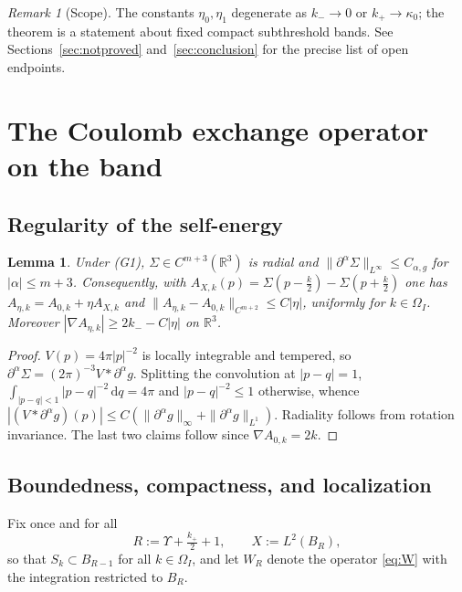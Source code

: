 \documentclass[11pt,a4paper]{amsart}
\newtheorem{lemma}[theorem]{Lemma}
\theoremstyle{definition}
\theoremstyle{remark}
\newtheorem{remark}[theorem]{Remark}
\newcommand{\R}{\mathbb{R}}
\newcommand{\dd}{\,\mathrm{d}}
\begin{document}
\begin{remark}[Scope]\label{rem:scope}
The constants $\eta_0,\eta_1$ degenerate as $k_-\to0$ or $k_+\to\kappa_0$; the theorem is a statement about fixed compact subthreshold bands. See Sections~\ref{sec:notproved} and~\ref{sec:conclusion} for the precise list of open endpoints.
\end{remark}

\section{The Coulomb exchange operator on the band}\label{sec:exchangeop}

\subsection{Regularity of the self-energy}
\begin{lemma}\label{lem:sigma}
Under \textup{(G1)}, $\Sigma\in C^{m+3}(\R^3)$ is radial and $\|\partial^\alpha\Sigma\|_{L^\infty}\le C_{\alpha,g}$ for $|\alpha|\le m+3$. Consequently, with $A_{X,k}(p)=\Sigma(p-\frac k2)-\Sigma(p+\frac k2)$ one has $A_{\eta,k}=A_{0,k}+\eta A_{X,k}$ and
$\|A_{\eta,k}-A_{0,k}\|_{C^{m+2}}\le C|\eta|$, uniformly for $k\in\Omega_I$. Moreover $|\nabla A_{\eta,k}|\ge 2k_- - C|\eta|$ on $\R^3$.
\end{lemma}

\begin{proof}
$V(p)=4\pi|p|^{-2}$ is locally integrable and tempered, so $\partial^\alpha\Sigma=(2\pi)^{-3}V*\partial^\alpha g$. Splitting the convolution at $|p-q|=1$,
$\int_{|p-q|<1}|p-q|^{-2}\dd q=4\pi$ and $|p-q|^{-2}\le1$ otherwise, whence
$|(V*\partial^\alpha g)(p)|\le C(\|\partial^\alpha g\|_\infty+\|\partial^\alpha g\|_{L^1})$. Radiality follows from rotation invariance. The last two claims follow since $\nabla A_{0,k}=2k$.
\end{proof}

\subsection{Boundedness, compactness, and localization}
Fix once and for all
\begin{equation}\label{eq:R}
R:=\Upsilon+\tfrac{k_+}2+1,\qquad X:=L^2(B_R),
\end{equation}
so that $S_k\subset B_{R-1}$ for all $k\in\Omega_I$, and let $W_R$ denote the operator \eqref{eq:W} with the integration restricted to $B_R$.
\end{document}
